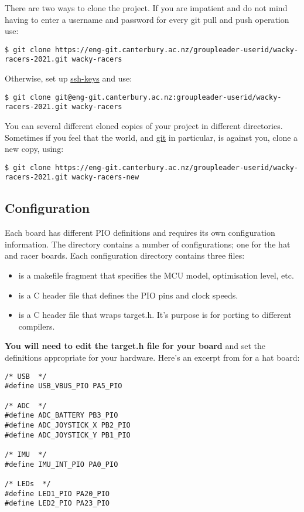 There are two ways to clone the project. If you are impatient and do not
mind having to enter a username and password for every git pull and push
operation use:
%
\begin{verbatim}
$ git clone https://eng-git.canterbury.ac.nz/groupleader-userid/wacky-racers-2021.git wacky-racers
\end{verbatim}

Otherwise, set up \url{ssh-keys} and use:
%
\begin{verbatim}
$ git clone git@eng-git.canterbury.ac.nz:groupleader-userid/wacky-racers-2021.git wacky-racers
\end{verbatim}

You can several different cloned copies of your project in different
directories. Sometimes if you feel that the world, and \url{git} in
particular, is against you, clone a new copy, using:


\begin{verbatim}
$ git clone https://eng-git.canterbury.ac.nz/groupleader-userid/wacky-racers-2021.git wacky-racers-new
\end{verbatim}

\subsection{Configuration}
\label{configuration}

Each board has different PIO definitions and requires its own
configuration information. The 
directory contains a number of configurations; one for the hat and racer
boards. Each configuration directory contains three files:

\begin{itemize}
\item
   is a makefile fragment that specifies the MCU model,
  optimisation level, etc.
\item
   is a C header file that defines the PIO pins and
  clock speeds.
\item
   is a C header file that wraps target.h. It's purpose
  is for porting to different compilers.
\end{itemize}

\textbf{You will need to edit the target.h file for your board} and set
the definitions appropriate for your hardware. Here's an excerpt from
 for a hat board:

\begin{verbatim}
/* USB  */
#define USB_VBUS_PIO PA5_PIO

/* ADC  */
#define ADC_BATTERY PB3_PIO
#define ADC_JOYSTICK_X PB2_PIO
#define ADC_JOYSTICK_Y PB1_PIO

/* IMU  */
#define IMU_INT_PIO PA0_PIO

/* LEDs  */
#define LED1_PIO PA20_PIO
#define LED2_PIO PA23_PIO
\end{verbatim}

